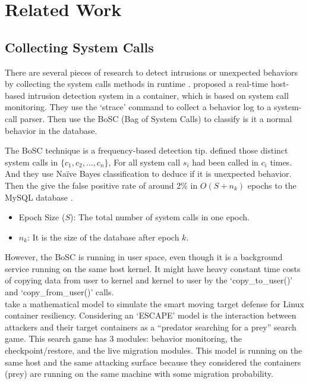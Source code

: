 \section{Related Work}

\subsection{Collecting System Calls}
There are several pieces of research to detect intrusions or unexpected behaviors
by collecting the system calls methods in runtime \cite{10.1007/978-3-319-24858-5_8,9307722,7809699,7796855}.
\textcite{10.1007/978-3-319-24858-5_8} proposed a real-time host-based intrusion
detection system in a container, which is based on system call monitoring. They use
the `strace' command to collect a behavior log to a system-call parser. Then use the
BoSC (Bag of System Calls) \cite{1495942} to classify is it a normal behavior in
the database.

The BoSC technique is a frequency-based detection tip. \textcite{1495942} defined
those distinct system calls in $\{c_1, c_2, \dots, c_n \}$, For all system call $s_i$
had been called in $c_i$ times. And they use Na\"ive Bayes classification to deduce if
it is unexpected behavior. Then the \citeauthor{10.1007/978-3-319-24858-5_8} give the false positive rate
of around 2\% in $O(S+n_k)$ epochs to the MySQL database \cite{10.1007/978-3-319-24858-5_8}.
\begin{itemize}
    \item Epoch Size ($S$): The total number of system calls in one epoch.
    \item $n_k$: It is the size of the database after epoch $k$.
\end{itemize}
However, the BoSC is running in user space, even though it is a background service running
on the same host kernel. It might have heavy constant time costs of copying data from
user to kernel and kernel to user by the `copy\_to\_user()' and `copy\_from\_user()' calls.\\

\textcite{7809699,7796855} take a mathematical model to simulate the
smart moving target defense for Linux container resiliency. Considering an `ESCAPE' model
is the interaction between attackers and their target containers as a “predator searching
for a prey” search game. This search game has 3 modules: behavior monitoring, the
checkpoint/restore, and the live migration modules.
This model is running on the same host and the same attacking surface because they considered
the containers (prey) are running on the same machine with some migration probability.

